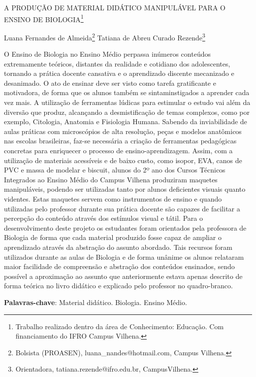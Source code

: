 \documentclass[article,12pt,onesidea,4paper,english,brazil]{abntex2}
\begin{document}
	
	
	\frenchspacing 
	
	\begin{center}
		\LARGE A PRODUÇÃO DE MATERIAL DIDÁTICO MANIPULÁVEL PARA O ENSINO DE BIOLOGIA\footnote{Trabalho realizado dentro da área de Conhecimento: Educação. Com financiamento do IFRO Campus Vilhena.}
		
		\normalsize
		Luana Fernandes de Almeida\footnote{Bolsista (PROASEN), luana\_nandes@hotmail.com, Campus Vilhena.} 
		Tatiana de Abreu Curado Rezende\footnote{Orientadora, tatiana.rezende@ifro.edu.br, CampusVilhena.} 
	\end{center}
	
	\noindent O Ensino de Biologia no Ensino Médio perpassa inúmeros conteúdos extremamente teóricos, distantes da realidade e cotidiano dos adolescentes, tornando a prática docente cansativa e o aprendizado discente mecanizado e desanimado. O ato de ensinar deve ser visto como tarefa gratificante e motivadora, de forma que os alunos também se sintaminstigados a aprender cada vez mais. A utilização de ferramentas lúdicas para estimular o estudo vai além da diversão que produz, alcançando a desmistificação de temas complexos, como por exemplo, Citologia, Anatomia e Fisiologia Humana. Sabendo da inviabilidade de aulas práticas com microscópios de alta resolução, peças e modelos anatômicos nas escolas brasileiras, faz-se necessária a criação de ferramentas pedagógicas concretas para enriquecer o processo de ensino-aprendizagem. Assim, com a utilização de materiais acessíveis e de baixo custo, como isopor, EVA, canos de PVC e massa de modelar e biscuit, alunos do 2º ano dos Cursos Técnicos Integrados ao Ensino Médio do Campus Vilhena produziram maquetes manipuláveis, podendo ser utilizadas tanto por alunos deficientes visuais quanto videntes. Estas maquetes servem como instrumentos de ensino e quando utilizadas pelo professor durante sua prática docente são capazes de facilitar a percepção do conteúdo através dos estímulos visual e tátil. Para o desenvolvimento deste projeto os estudantes foram orientados pela professora de Biologia de forma que cada material produzido fosse capaz de ampliar o aprendizado através da abstração do assunto abordado. Tais recursos foram utilizados durante as aulas de Biologia e de forma unânime os alunos relataram maior facilidade de compreensão e abstração dos conteúdos ensinados, sendo possível a aproximação ao assunto que anteriormente estava apenas descrito de forma teórica no livro didático e explicado pelo professor no quadro-branco.
	
	\vspace{\onelineskip}
	
	\noindent
	\textbf{Palavras-chave}: Material didático. Biologia. Ensino Médio.
	
\end{document}
